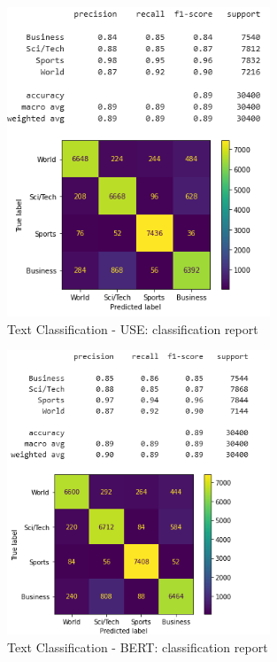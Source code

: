 \begin{figure}[ht!]
    \centering
    \includegraphics[width=0.7\textwidth]{img/results/cmatrix_textc_use.png}
    \caption{Text Classification - USE: classification report}
    \label{fig:creport_textc_use}
\end{figure}
\begin{figure}[ht!]
    \centering
    \includegraphics[width=0.7\textwidth]{img/results/cmatrix_textc_bert.png}
    \caption{Text Classification - BERT: classification report}
    \label{fig:creport_textc_bert}
\end{figure}

